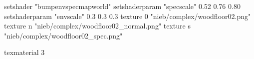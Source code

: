 setshader "bumpenvspecmapworld"
setshaderparam "specscale" 0.52 0.76 0.80
setshaderparam "envscale"  0.3 0.3 0.3
   texture 0 "nieb/complex/woodfloor02.png"
   texture n "nieb/complex/woodfloor02_normal.png"
   texture s "nieb/complex/woodfloor02_spec.png"

texmaterial 3
